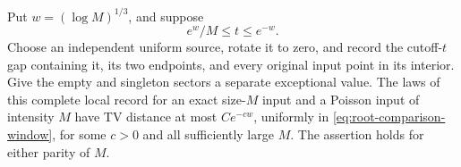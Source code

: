 \documentclass[11pt,letterpaper]{article}
\begin{document}
\begin{lemma}
\label{lem:complete-root-depoisson}
Put $w=(\log M)^{1/3}$, and suppose
\begin{equation}\label{eq:root-comparison-window}
 e^w/M\le t\le e^{-w}.
\end{equation}
Choose an independent uniform source, rotate it to zero, and record
the cutoff-$t$ gap containing it, its two endpoints, and every
original input point in its interior. Give the empty and singleton
sectors a separate exceptional value. The laws of this complete
local record for an exact size-$M$ input and a Poisson input of
intensity $M$ have TV distance at most $Ce^{-cw}$, uniformly in
\eqref{eq:root-comparison-window}, for some $c>0$ and all sufficiently
large $M$. The assertion holds for either parity of $M$.
\end{lemma}
\end{document}
